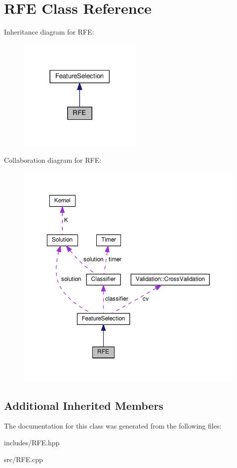 \hypertarget{class_r_f_e}{}\section{R\+FE Class Reference}
\label{class_r_f_e}


Inheritance diagram for R\+FE\+:\nopagebreak
\begin{figure}[H]
\begin{center}
\leavevmode
\includegraphics[width=170pt]{class_r_f_e__inherit__graph}
\end{center}
\end{figure}


Collaboration diagram for R\+FE\+:\nopagebreak
\begin{figure}[H]
\begin{center}
\leavevmode
\includegraphics[width=350pt]{class_r_f_e__coll__graph}
\end{center}
\end{figure}
\subsection*{Additional Inherited Members}


The documentation for this class was generated from the following files\+:\begin{DoxyCompactItemize}
\item 
includes/R\+F\+E.\+hpp\item 
src/R\+F\+E.\+cpp\end{DoxyCompactItemize}
